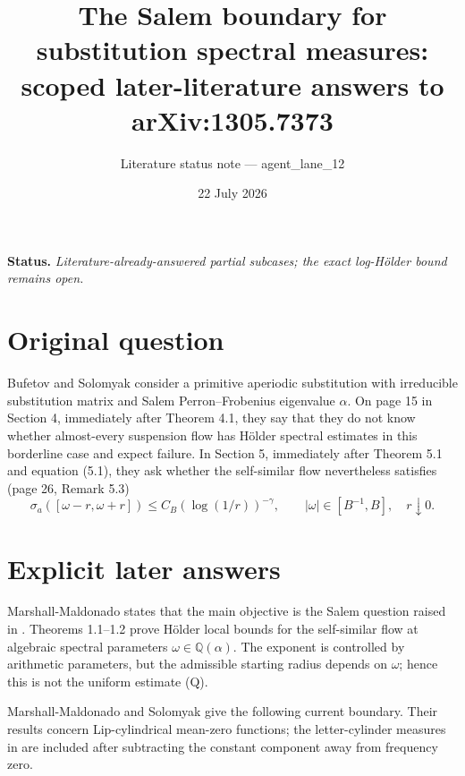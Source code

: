 \documentclass[11pt]{article}
\title{The Salem boundary for substitution spectral measures:\\
scoped later-literature answers to arXiv:1305.7373}
\author{Literature status note --- agent\_lane\_12}
\date{22 July 2026}
\newcommand{\Q}{\mathbb Q}
\newcommand{\sig}{\sigma}
\begin{document}
\maketitle

\noindent\textbf{Status.}
\emph{Literature-already-answered partial subcases; the exact log-H\"older
bound remains open.}

\section*{Original question}
Bufetov and Solomyak \cite{BS14} consider a primitive aperiodic substitution
with irreducible substitution matrix and Salem Perron--Frobenius eigenvalue
\(\alpha\).  On page 15 in Section 4, immediately after Theorem 4.1, they say that they
do not know whether almost-every suspension flow has H\"older spectral
estimates in this borderline case and expect failure.  In Section 5,
immediately after Theorem 5.1 and equation (5.1), they ask whether the
self-similar flow nevertheless satisfies (page 26, Remark 5.3)
\[
 \sig_a([\omega-r,\omega+r])
 \le C_B(\log(1/r))^{-\gamma},
 \qquad |\omega|\in[B^{-1},B],\quad r\downarrow0. \tag{Q}
\]

\section*{Explicit later answers}
Marshall-Maldonado \cite{MM24} states that the main objective is the Salem
question raised in \cite{BS14}.  Theorems 1.1--1.2 prove H\"older local bounds
for the self-similar flow at algebraic spectral parameters
\(\omega\in\Q(\alpha)\).  The exponent is controlled by arithmetic parameters,
but the admissible starting radius depends on \(\omega\); hence this is not the
uniform estimate (Q).

Marshall-Maldonado and Solomyak \cite{MS26} give the following current
boundary.  Their results concern Lip-cylindrical mean-zero functions; the
letter-cylinder measures in \cite{BS14} are included after subtracting the
constant component away from frequency zero.
\end{document}
